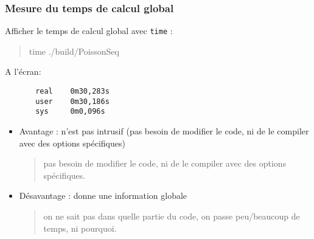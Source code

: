 \documentclass{beamer}
\begin{document}
\begin{frame}[fragile]
	\frametitle{Mesure du temps de calcul global}
	Afficher le temps de calcul global avec {\tt time} :
		\begin{quote}
	       time ./build/PoissonSeq
        \end{quote}
	
	A l'\'ecran:
	\begin{verbatim}
	   real    0m30,283s
	   user    0m30,186s
	   sys     0m0,096s
	\end{verbatim}
	
	\begin{itemize}
		\item Avantage : n'est pas intrusif (pas besoin de modifier le code, ni de le compiler avec des options sp\'ecifiques)
		\begin{quote}
			pas besoin de modifier le code, ni de le compiler avec des options sp\'ecifiques.
		\end{quote} 
		\item D\'esavantage : donne une information globale
		\begin{quote}
			on ne sait pas dans quelle partie du code, on passe peu/beaucoup de temps, ni pourquoi.
		\end{quote} 
	\end{itemize}
\vfill
\end{frame}
	
\end{document}
